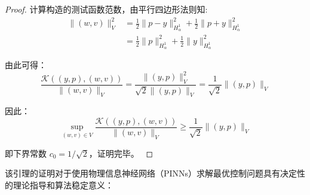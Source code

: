 \documentclass{xmu}
\theoremstyle{plain}
\theoremstyle{remark}
\begin{document}
\begin{proof}
  计算构造的测试函数范数，由平行四边形法则知:
  \begin{align}
  \|(w,v)\|_V^2
  &= \frac{1}{2}\|p-y\|_{H_\alpha^1}^2 + \frac{1}{2}\|p+y\|_{H_\alpha^1}^2 \\
  &= \frac{1}{2}\|p\|_{H_\alpha^1}^2 +\frac{1}{2} \|y\|_{H_\alpha^1}^2
  \end{align}

  由此可得：
  \begin{equation}
  \frac{\mathcal{K}((y,p), (w,v))}{\|(w,v)\|_V} = \frac{\|(y,p)\|_V^2}{\sqrt{2}\|(y,p)\|_V} = \frac{1}{\sqrt{2}}\|(y,p)\|_V
  \end{equation}

  因此：
  \begin{equation}
  \sup_{(w,v)\in V} \frac{\mathcal{K}((y,p), (w,v))}{\|(w,v)\|_V} \ge \frac{1}{\sqrt{2}} \|(y,p)\|_V
  \end{equation}

  即下界常数 $c_0 = 1/\sqrt{2}$，证明完毕。\cite{3} \cite{6}
\end{proof}

\label{subsec:pinn-implications}

该引理的证明对于使用物理信息神经网络（PINNs）求解最优控制问题具有决定性的理论指导和算法稳定意义：
\end{document}
